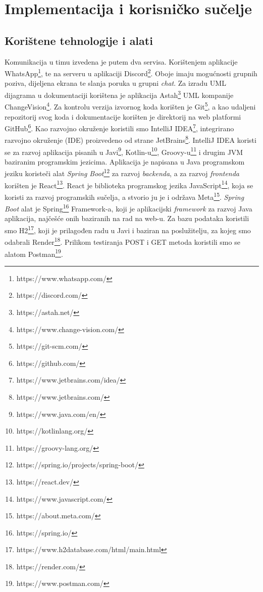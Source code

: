 \chapter{Implementacija i korisničko sučelje}
		
		
		\section{Korištene tehnologije i alati}
		
			Komunikacija u timu izvedena je putem dva servisa. Korištenjem aplikacije WhatsApp\footnote{https://www.whatsapp.com/}, te na serveru u aplikaciji Discord\footnote{https://discord.com/}. Oboje imaju mogućnosti grupnih poziva, dijeljena ekrana te slanja poruka u grupni \textit{chat}. 
			Za izradu UML dijagrama u dokumentaciji korištena je aplikacija Astah\footnote{https://astah.net/} UML kompanije ChangeVision\footnote{https://www.change-vision.com/}. Za kontrolu verzija izvornog koda korišten je Git\footnote{https://git-scm.com/}, a kao udaljeni repozitorij svog koda i dokumentacije korišten je direktorij na web platformi GitHub\footnote{https://github.com/}.
			Kao razvojno okruženje koristili smo IntelliJ IDEA\footnote{https://www.jetbrains.com/idea/}, integrirano razvojno okruženje (IDE) proizvedeno od strane JetBrains\footnote{https://www.jetbrains.com/}. IntelliJ IDEA koristi se za razvoj aplikacija pisanih u Javi\footnote{https://www.java.com/en/}, Kotlin-u\footnote{https://kotlinlang.org/}, Groovy-u\footnote{https://groovy-lang.org/} i drugim JVM baziranim programskim jezicima.
			Aplikacija je napisana u Java programskom jeziku koristeči alat \textit{Spring Boot}\footnote{https://spring.io/projects/spring-boot/} za razvoj \textit{backenda}, a za razvoj \textit{frontenda} korišten je React\footnote{https://react.dev/}. React je biblioteka programskog jezika JavaScript\footnote{https://www.javascript.com/}, koja se koristi za razvoj programskih sučelja, a stvorio ju je i održava Meta\footnote{https://about.meta.com/}. \textit{Spring Boot} alat je Spring\footnote{https://spring.io/} Framework-a, koji je aplikacijski \textit{framework} za razvoj Java aplikacija, najčešće onih baziranih na rad na web-u.
			Za bazu podataka koristili smo H2\footnote{https://www.h2database.com/html/main.html}, koji je prilagođen radu u Javi i baziran na poslužitelju, za kojeg smo odabrali Render\footnote{https://render.com/}. Prilikom testiranja POST i GET metoda koristili smo se alatom Postman\footnote{https://www.postman.com/}.
			
			\eject 
		

